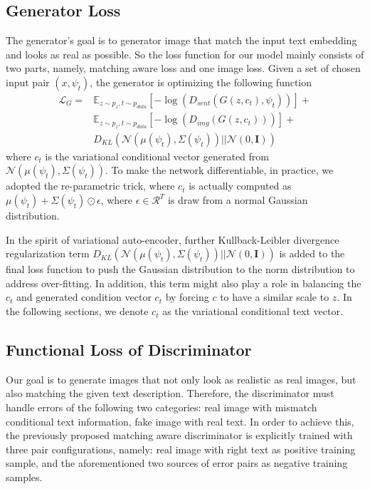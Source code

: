 \documentclass[10pt,twocolumn,letterpaper]{article}
\begin{document}
\subsection{Generator Loss}
The generator's goal is to generator image that match the input text embedding and looks as real as possible. So the loss function for our model mainly consists of two parts, namely, matching aware loss and one image loss.  
Given a set of chosen input pair $(x, \psi_t)$, the generator is optimizing the following function
 \begin{equation}
 \label{genloss}
 \begin{split}
 \mathcal{L}_G = & \mathbb{E}_{z\sim p_{z}, t \sim p_{data}}[-\log( D_{sent}( G(z, c_t),  \psi_t) ) ] + \\
				  & \mathbb{E}_{z\sim p_{z}, t \sim p_{data}}[-\log( D_{img}( G(z, c_t) ) ) ] + \\
                  & D_{KL}(\mathcal{N}(\mu(\psi_t), \Sigma(\psi_t) )|| \mathcal{N}(0, \bm{I})) 		   
 \end{split}
 \end{equation}
 where $c_t$ is the variational conditional vector generated from $\mathcal{N}(\mu(\psi_t), \Sigma(\psi_t) )$. To make the network differentiable, in practice, we adopted the re-parametric trick\cite{vae}, where $c_t$ is actually computed as $\mu(\psi_t)+\Sigma(\psi_t)\odot \epsilon$, where $\epsilon\in \mathcal{R}^{T}$ is draw from a normal Gaussian distribution.  
 
 In the spirit of variational auto-encoder, further Kullback-Leibler divergence regularization term  $D_{KL}(\mathcal{N}(\mu(\psi_t), \Sigma(\psi_t) )|| \mathcal{N}(0, \bm{I}))$ is added to the final loss function to push the Gaussian distribution to the norm distribution to address over-fitting.  In addition, this term might also play a role in balancing the $c_t$ and generated condition vector $c_t$ by forcing $c$ to have a similar scale to $z$.  In the following sections, we denote $c_t$ as the variational conditional text vector.
 
 
\subsection{Functional Loss of Discriminator}
 Our goal is to generate images that not only look as realistic as real images, but also matching the given text description.
 Therefore, the discriminator must handle errors of the following two categories: real image with mismatch conditional text information, fake image with real text. In order to achieve this, the previously proposed matching aware discriminator is explicitly trained with three pair configurations, namely: real image with right text as positive training sample, and the aforementioned two sources of error pairs as negative training samples. 
 
\end{document}
